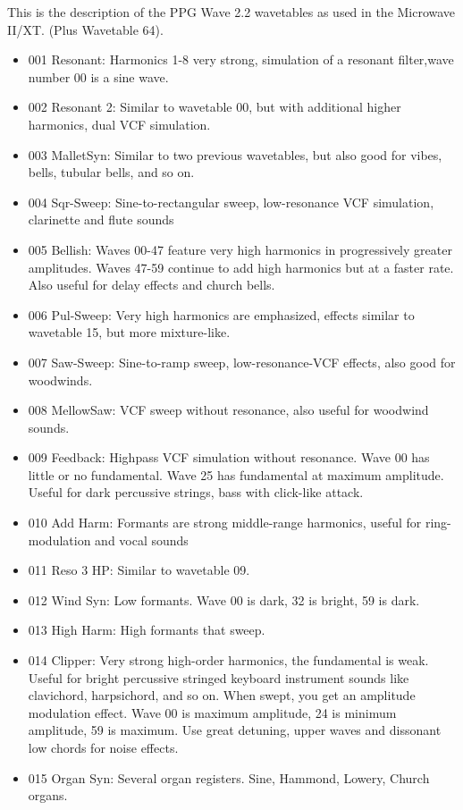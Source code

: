 This is the description of the PPG Wave 2.2 wavetables as used in the Microwave II/XT. (Plus Wavetable 64).
\begin{itemize}
	\item 001 Resonant: Harmonics 1-8 very strong, simulation of a resonant filter,wave number 00 is a sine wave.
	\item 002 Resonant 2: Similar to wavetable 00, but with additional higher harmonics, dual VCF simulation.
	\item 003 MalletSyn: Similar to two previous wavetables, but also good for vibes, bells, tubular bells, and so on.
	\item 004 Sqr-Sweep: Sine-to-rectangular sweep, low-resonance VCF simulation, clarinette and flute sounds
	\item 005 Bellish: Waves 00-47 feature very high harmonics in progressively greater amplitudes. Waves 47-59 continue to add high harmonics but at a faster rate. Also useful for delay effects and church bells.
	\item 006 Pul-Sweep: Very high harmonics are emphasized, effects similar to wavetable 15, but more mixture-like.
	\item 007 Saw-Sweep: Sine-to-ramp sweep, low-resonance-VCF effects, also good for woodwinds.
	\item 008 MellowSaw: VCF sweep without resonance, also useful for woodwind sounds.
	\item 009 Feedback: Highpass VCF simulation without resonance. Wave 00 has little or no fundamental. Wave 25 has fundamental at maximum amplitude. Useful for dark percussive strings, bass with click-like attack.
	\item 010 Add Harm: Formants are strong middle-range harmonics, useful for ring-modulation and vocal sounds
	\item 011 Reso 3 HP: Similar to wavetable 09.
	\item 012 Wind Syn: Low formants. Wave 00 is dark, 32 is bright, 59 is dark.
	\item 013 High Harm: High formants that sweep.
	\item 014 Clipper: Very strong high-order harmonics, the fundamental is weak. Useful for bright percussive stringed keyboard instrument sounds like clavichord, harpsichord, and so on. When swept, you get an amplitude modulation effect. Wave 00 is maximum amplitude, 24 is minimum amplitude, 59 is maximum. Use great detuning, upper waves and dissonant low chords for noise effects.
	\item 015 Organ Syn: Several organ registers. Sine, Hammond, Lowery, Church organs.

\end{itemize}
